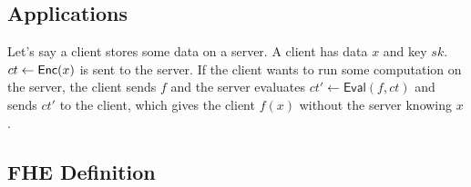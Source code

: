 \subsection{Applications}
\begin{example}
    Let's say a client stores some data on a server. A client has data $x$ and key $sk$. $ct\leftarrow\operatorname{\mathsf{Enc}}(x)$ is sent to the server. If the client wants to run some computation on the server, the client sends $f$ and the server evaluates $ct' \leftarrow \mathsf{Eval}(f, ct)$ and sends $ct'$ to the client, which gives the client $f(x)$ without the server knowing $x$.
    
\end{example}

\subsection{FHE Definition}

